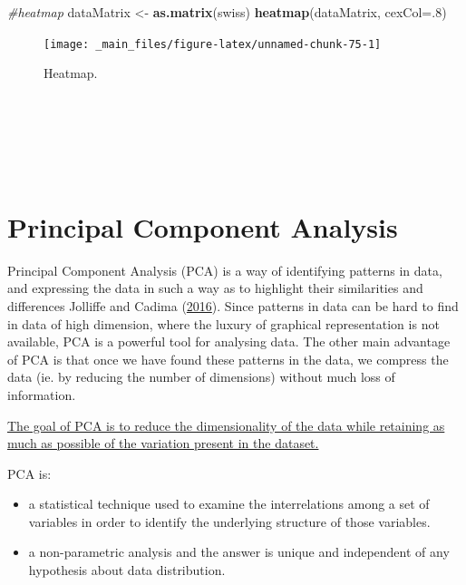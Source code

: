\documentclass[
]{svmono}
\newenvironment{Shaded}{\begin{snugshade}}{\end{snugshade}}
\newcommand{\AttributeTok}[1]{\textcolor[rgb]{0.13,0.29,0.53}{#1}}
\newcommand{\CommentTok}[1]{\textcolor[rgb]{0.56,0.35,0.01}{\textit{#1}}}
\newcommand{\DecValTok}[1]{\textcolor[rgb]{0.00,0.00,0.81}{#1}}
\newcommand{\FunctionTok}[1]{\textcolor[rgb]{0.13,0.29,0.53}{\textbf{#1}}}
\newcommand{\NormalTok}[1]{#1}
\newcommand{\OtherTok}[1]{\textcolor[rgb]{0.56,0.35,0.01}{#1}}
\providecommand{\tightlist}{%
  \setlength{\itemsep}{0pt}\setlength{\parskip}{0pt}}
\begin{document}
\begin{Shaded}
\begin{Highlighting}[]
\CommentTok{\#heatmap}
\NormalTok{dataMatrix }\OtherTok{\textless{}{-}} \FunctionTok{as.matrix}\NormalTok{(swiss)}
\FunctionTok{heatmap}\NormalTok{(dataMatrix, }\AttributeTok{cexCol=}\NormalTok{.}\DecValTok{8}\NormalTok{)}
\end{Highlighting}
\end{Shaded}

\begin{figure}[H]

{\centering \texttt{[image: \_main\_files/figure-latex/unnamed-chunk-75-1]} 

}

\caption{Heatmap.}\label{fig:unnamed-chunk-75}
\end{figure}

~

~

~

\hypertarget{principal-component-analysis}{%
\section{Principal Component Analysis}\label{principal-component-analysis}}

Principal Component Analysis (PCA) is a way of identifying patterns in
data, and expressing the data in such a way as to highlight their
similarities and differences Jolliffe and Cadima (\protect\hyperlink{ref-jolliffe2016}{2016}). Since patterns
in data can be hard to find in data of high dimension, where the luxury
of graphical representation is not available, PCA is a powerful tool for
analysing data. The other main advantage of PCA is that once we have
found these patterns in the data, we compress the data (ie. by reducing
the number of dimensions) without much loss of information.

\ul{The goal of PCA is to reduce the dimensionality of the data while
retaining as much as possible of the variation present in the
dataset.}

PCA is:

\begin{itemize}
\tightlist
\item
  a statistical technique used to examine the interrelations among a
  set of variables in order to identify the underlying structure of
  those variables.
\item
  a non-parametric analysis and the answer is unique and independent
  of any hypothesis about data distribution.
\end{itemize}
\end{document}
